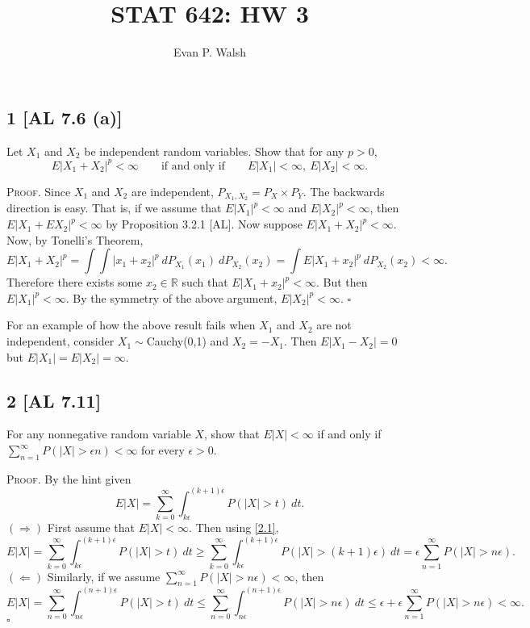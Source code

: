 \documentclass[12pt]{article}
\title{STAT 642: HW 3}
\author{Evan P. Walsh}
\newcounter{ProofCounter}
\newenvironment{Proof}{\stepcounter{ProofCounter}\textsc{Proof.}}{\hfill$\square$}
\begin{document}
\maketitle

\subsection*{1 [AL 7.6 (a)]}
\begin{tcolorbox}
Let $X_{1}$ and $X_{2}$ be independent random variables. Show that for any $p > 0$,
\[ E|X_{1} + X_{2}|^{p} < \infty \qquad \text{if and only if} \qquad E|X_{1}| < \infty,\  E|X_{2}| < \infty. \]
\end{tcolorbox}
\begin{Proof}
Since $X_{1}$ and $X_{2}$ are independent, $P_{X_{1},X_{2}} = P_{X}\times P_{Y}$. The backwards direction is easy. That is, if we assume that
$E|X_{1}|^{p} < \infty$ and $E|X_{2}|^p < \infty$, then $E|X_{1} + EX_{2}|^{p} < \infty$ by Proposition 3.2.1 [AL]. Now suppose $E|X_{1} + X_{2}|^{p}
< \infty$. Now, by Tonelli's Theorem,
\[ E|X_{1} + X_{2}|^{p} = \int \int |x_{1} + x_{2}|^{p}\ dP_{X_{1}}(x_{1})\ dP_{X_{2}}(x_{2}) = \int E|X_{1} + x_{2}|^{p} \ dP_{X_{2}}(x_{2}) < \infty. \]
Therefore there exists some $x_{2} \in \mathbb{R}$ such that $E|X_{1} + x_{2}|^{p} < \infty$. But then $E|X_{1}|^{p} < \infty$. By the symmetry of the
above argument, $E|X_{2}|^{p} < \infty$.
\end{Proof}

For an example of how the above result fails when $X_{1}$ and $X_{2}$ are not independent, consider $X_{1} \sim $Cauchy(0,1) and $X_{2} = -X_{1}$. Then
$E|X_{1} - X_{2}| = 0$ but $E|X_{1}| = E|X_{2}| = \infty$.


\subsection*{2 [AL 7.11]}
\begin{tcolorbox}
For any nonnegative random variable $X$, show that $E|X| < \infty$ if and only if $\sum_{n=1}^{\infty}P(|X| > \epsilon n) < \infty$ for every
$\epsilon > 0$.
\end{tcolorbox}
\begin{Proof}
By the hint given
\begin{equation}
E|X| = \sum_{k=0}^{\infty}\int_{k\epsilon}^{(k+1)\epsilon}P(|X| > t)\ dt.
\label{2.1}
\end{equation}
$(\Rightarrow)$ First assume that $E|X| < \infty$. Then using \eqref{2.1},
\[ E|X| = \sum_{k=0}^{\infty}\int_{k\epsilon}^{(k+1)\epsilon}P(|X| > t)\ dt \geq \sum_{k=0}^{\infty}\int_{k\epsilon}^{(k+1)\epsilon}P(|X| >
(k+1)\epsilon)\ dt = \epsilon\sum_{n=1}^{\infty}P(|X| > n\epsilon). \]
$(\Leftarrow)$ Similarly, if we assume $\sum_{n=1}^{\infty}P(|X| > n\epsilon) < \infty$, then 
\[ E|X| = \sum_{n=0}^{\infty}\int_{n\epsilon}^{(n+1)\epsilon}P(|X| > t)\ dt \leq \sum_{n=0}^{\infty}\int_{n\epsilon}^{(n+1)\epsilon}P(|X| >
n\epsilon)\ dt \leq \epsilon + \epsilon\sum_{n=1}^{\infty}P(|X| > n\epsilon) < \infty. \]
\end{Proof}
\end{document}
